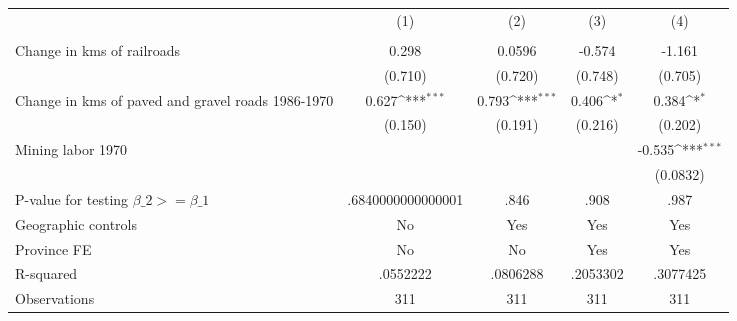 {
\def\sym#1{\ifmmode^{#1}\else\(^{#1}\)\fi}
\begin{tabular}{l*{4}{c}}
\hline\hline
                &\multicolumn{1}{c}{(1)}&\multicolumn{1}{c}{(2)}&\multicolumn{1}{c}{(3)}&\multicolumn{1}{c}{(4)}\\
                &\multicolumn{1}{c}{}&\multicolumn{1}{c}{}&\multicolumn{1}{c}{}&\multicolumn{1}{c}{}\\
\hline
Change in kms of railroads&    0.298         &   0.0596         &   -0.574         &   -1.161         \\
                &  (0.710)         &  (0.720)         &  (0.748)         &  (0.705)         \\
[1em]
Change in kms of paved and gravel roads 1986-1970&    0.627\sym{***}&    0.793\sym{***}&    0.406\sym{*}  &    0.384\sym{*}  \\
                &  (0.150)         &  (0.191)         &  (0.216)         &  (0.202)         \\
[1em]
Mining labor 1970&                  &                  &                  &   -0.535\sym{***}\\
                &                  &                  &                  & (0.0832)         \\
\hline
P-value for testing $\beta\_{2} >= \beta\_{1}$&.6840000000000001         &     .846         &     .908         &     .987         \\
Geographic controls&       No         &      Yes         &      Yes         &      Yes         \\
Province FE     &       No         &       No         &      Yes         &      Yes         \\
R-squared       & .0552222         & .0806288         & .2053302         & .3077425         \\
Observations    &      311         &      311         &      311         &      311         \\
\hline\hline
\end{tabular}
}
